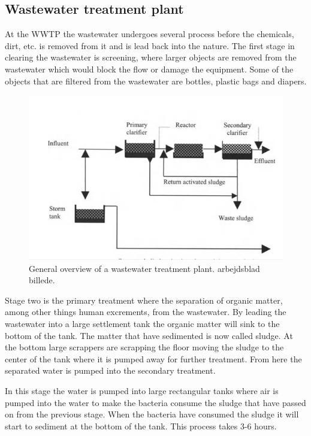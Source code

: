 \subsection{Wastewater treatment plant}\label{subse:Wastewater treatment plant}
At the WWTP the wastewater undergoes several process before the chemicals, dirt, etc. is removed from it and is lead back into the nature. The first stage in clearing the wastewater is screening, where larger objects are removed from the wastewater which would block the flow or damage the equipment. Some of the objects that are filtered from the wastewater are bottles, plastic bags and diapers.  %
\begin{figure}[H]
\centering
\includegraphics[width=1\textwidth]{report/introduction/pictures/WWTP_overview.png}
\caption{General overview of a wastewater treatment plant. arbejdsblad billede. }
\label{fig:sewer_overview_of_the_chemical_process}
\end{figure}


Stage two is the primary treatment where the separation of organic matter, among other things human excrements, from the wastewater. By leading the wastewater into a large settlement tank the organic matter will sink to the bottom of the tank. The matter that have sedimented is now called sludge. At the bottom large scrappers are scrapping the floor moving the sludge to the center of the tank where it is pumped away for further treatment. From here the separated water is pumped into the secondary treatment. 

In this stage the water is pumped into large rectangular tanks where air is pumped into the water to make the bacteria consume the sludge that have passed on from the previous stage. When the bacteria have consumed the sludge it will start to sediment at the bottom of the tank. This process takes 3-6 hours.  


